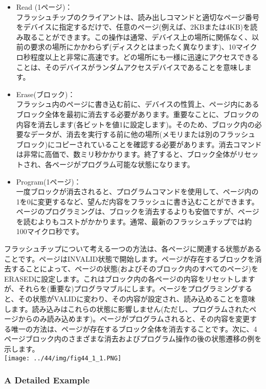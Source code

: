 \begin{itemize}
\item
  Read (1ページ)：\\
  フラッシュチップのクライアントは、読み出しコマンドと適切なページ番号をデバイスに指定するだけで、任意のページ(例えば、2KBまたは4KB)を読み取ることができます。この操作は通常、デバイス上の場所に関係なく、以前の要求の場所にかかわらず(ディスクとはまったく異なります)、10マイクロ秒程度以上と非常に高速です。どの場所にも一様に迅速にアクセスできることは、そのデバイスがランダムアクセスデバイスであることを意味します。
\item
  Erase(ブロック)：\\
  フラッシュ内のページに書き込む前に、デバイスの性質上、ページ内にあるブロック全体を最初に消去する必要があります。重要なことに、ブロックの内容を消去します(各ビットを値1に設定します)。そのため、ブロック内の必要なデータが、消去を実行する前に他の場所(メモリまたは別のフラッシュブロック)にコピーされていることを確認する必要があります。消去コマンドは非常に高価で、数ミリ秒かかります。終了すると、ブロック全体がリセットされ、各ページがプログラム可能な状態になります。
\item
  Program(1ページ)：\\
  一度ブロックが消去されると、プログラムコマンドを使用して、ページ内の1を0に変更するなど、望んだ内容をフラッシュに書き込むことができます。ページのプログラミングは、ブロックを消去するよりも安価ですが、ページを読むよりもコストがかかります。通常、最新のフラッシュチップでは約100マイクロ秒です。
\end{itemize}

フラッシュチップについて考える一つの方法は、各ページに関連する状態があることです。ページはINVALID状態で開始します。ページが存在するブロックを消去することによって、ページの状態(およびそのブロック内のすべてのページ)をERASEDに設定します。これはブロック内の各ページの内容をリセットしますが、それらを(重要な)プログラマブルにします。ページをプログラミングすると、その状態がVALIDに変わり、その内容が設定され、読み込めることを意味します。読み込みはこれらの状態に影響しません(ただし、プログラムされたページからのみ読み込めます)。ページがプログラムされると、その内容を変更する唯一の方法は、ページが存在するブロック全体を消去することです。次に、4ページブロック内のさまざまな消去およびプログラム操作の後の状態遷移の例を示します。\\
\texttt{[image: ../44/img/fig44\_1\_1.PNG]}

\hypertarget{a-detailed-example-1}{%
\subsubsection*{A Detailed Example}\label{a-detailed-example-1}}

